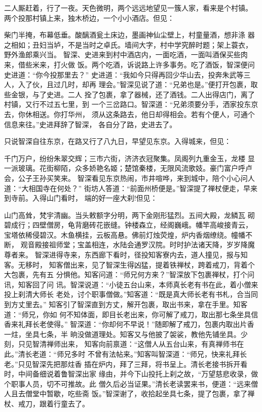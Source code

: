 二人厮赶着，行了一夜。天色微明，两个远远地望见一簇人家，看来是个村镇。
两个投那村镇上来，独木桥边，一个小小酒店。但见：

柴门半掩，布幕低垂。酸醨酒瓮土床边，墨画神仙尘壁上，村童量酒，想非涤
器之相如；丑妇当垆，不是当时之卓氏。墙间大字，村中学究醉时题；架上蓑衣，
野外渔郎乘兴当。
智深、史进来到村中酒店内，一面吃酒，一面叫酒保买些肉来，借些米来，打火做
饭。两个吃酒，诉说路上许多事务。吃了酒饭，智深便问史进道：“你今投那里去？”
史进道：“我如今只得再回少华山去，投奔朱武等三人，入了伙，且过几时，却再
理会。”智深见说了道：“兄弟也是。”便打开包裹，取些金银，与了史进。二人
拴了包裹，拿了器械，还了酒钱。二人出得店门，离了村镇，又行不过五七里，到
一个三岔路口。智深道：“兄弟须要分手，洒家投东京去，你休相送。你打华州，
须从这条路去，他日却得相会。若有个便人，可通个信息来往。”史进拜辞了智深，
各自分了路，史进去了。

只说智深自往东京，在路又行了八九日，早望见东京。入得城来，但见：

千门万户，纷纷朱翠交辉；三市六街，济济衣冠聚集。凤阁列九重金玉，龙楼
显一派玻璃。花街柳陌，众多娇艳名姬；楚馆秦楼，无限风流歌妓。豪门富户呼卢
会，公子王孙买笑来。
智深看见东京热闹，市井喧哗，来到城中，陪个小心问人道：“大相国寺在何处？”
街坊人答道：“前面州桥便是。”智深提了禅杖便走，早来到寺前。入得山门看时，
端的好一座大刹!但见：

山门高耸，梵宇清幽。当头敕额字分明，两下金刚形猛烈。五间大殿，龙鳞瓦
砌碧成行；四壁僧房，龟背磨砖花嵌缝。钟楼森立，经阁巍峨。幡竿高峻接青云，
宝塔依稀侵碧汉。木鱼横挂，云板高悬。佛前灯烛荧煌，炉内香烟缭绕。幢幡不断，
观音殿接祖师堂；宝盖相连，水陆会通罗汉院。时时护法诸天降，岁岁降魔尊者来。
智深进得寺来，东西廊下看时，径投知客寮内去，道人撞见，报与知客。无移时，
知客僧出来，见了智深生得凶猛，提着铁禅杖，跨着戒刀，背着个大包裹，先有五
分惧他。知客问道：“师兄何方来？”智深放下包裹禅杖，打个问讯，知客回了问
讯。智深说道：“小徒五台山来，本师真长老有书在此，着小僧来投上刹清大师长
老处，讨个职事僧做。”知客道：“既是真大师长老有书札，合当同到方丈里去。”
知客引了智深直到方丈，解开包裹，取出书来，拿在手里。知客道：“师兄，你如
何不知体面，即目长老出来，你可解了戒刀，取出那七条坐具信香来礼拜长老使得。”
智深道：“你却何不早说！”随即解了戒刀，包裹内取出片香一炷，坐具七条，半
晌没做道理处。知客又与他披了袈裟，教他先铺坐具。少刻，只见智清禅师出来，
知客向前禀道：“这僧人从五台山来，有真禅师书在此。”清长老道：“师兄多时
不曾有法帖来。”知客叫智深道：“师兄，快来礼拜长老。”只见智深先把那炷香
插在炉内，拜了三拜，将书呈上。清长老接书拆开看时，中间备细说着鲁智深出家
缘由，并今下山投托上刹之故，“万望慈悲收录，做个职事人员，切不可推故。此
僧久后必当证果。”清长老读罢来书，便道：“远来僧人且去僧堂中暂歇，吃些斋
饭。”智深谢了，收拾起坐具七条，提了包裹，拿了禅杖、戒刀，跟着行童去了。

